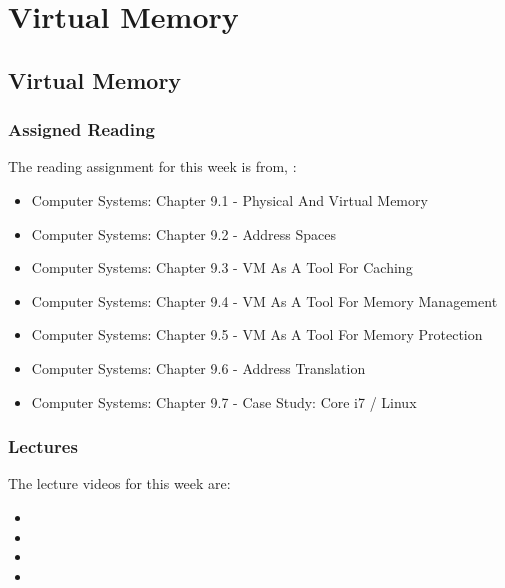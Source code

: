 \clearpage

\renewcommand{\ChapTitle}{Virtual Memory}
\renewcommand{\SectionTitle}{Virtual Memory}
\chapter{\ChapTitle}

\section{\SectionTitle}

\subsection{Assigned Reading}

The reading assignment for this week is from, \Textbook:

\begin{itemize}
    \item Computer Systems: Chapter 9.1 - Physical And Virtual Memory
    \item Computer Systems: Chapter 9.2 - Address Spaces
    \item Computer Systems: Chapter 9.3 - VM As A Tool For Caching
    \item Computer Systems: Chapter 9.4 - VM As A Tool For Memory Management
    \item Computer Systems: Chapter 9.5 - VM As A Tool For Memory Protection
    \item Computer Systems: Chapter 9.6 - Address Translation
    \item Computer Systems: Chapter 9.7 - Case Study: Core i7 / Linux
\end{itemize}

\subsection{Lectures}

The lecture videos for this week are:

\begin{itemize}
    \item {}
    \item {}
    \item {}
    \item {}
\end{itemize}

